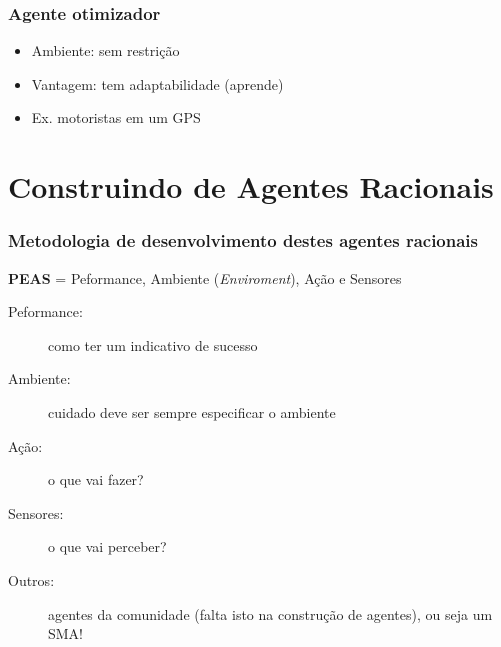 \begin{frame} %

    \frametitle{Agente otimizador}

\begin{itemize}
  \item Ambiente: sem restrição
  
  \item Vantagem:  tem adaptabilidade (aprende)
  
  \item Ex.  motoristas em um GPS
  
\end{itemize}
\end{frame}



\section{Construindo de Agentes Racionais}

\begin{frame}%

   \frametitle{Metodologia de desenvolvimento destes agentes racionais}
  \begin{block}{\textbf{PEAS} = Peformance, Ambiente (\textit{Enviroment}), Ação e Sensores}
  
   \begin{description}
  
     \item[Peformance:] como ter um indicativo de sucesso
     
    \item[Ambiente:]  cuidado deve ser sempre 
especificar o ambiente
          
   \item[Ação:] o que vai fazer?
                          
  \item[Sensores:] o que vai perceber?

  \item[Outros:] agentes da comunidade (falta isto na construção de agentes), ou seja um SMA!

          
   \end{description}
  \end{block}    
   
\end{frame}


